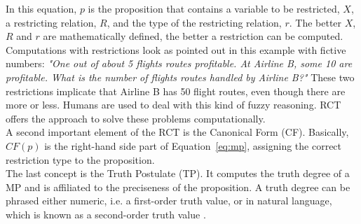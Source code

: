 \documentclass[conference]{IEEEtran}
\begin{document}
In this equation, \begin{math} p \end{math} is the proposition that contains a variable to be restricted, \begin{math} X \end{math}, a restricting relation, \begin{math} R \end{math}, and the type of the restricting relation, \begin{math} r \end{math}. The better \begin{math} X \end{math}, \begin{math} R \end{math} and \begin{math} r \end{math} are mathematically defined, the better a restriction can be computed. Computations with restrictions look as pointed out in this example with fictive numbers: \emph{"One out of about 5 flights routes profitable. At Airline B, some 10 are profitable. What is the number of flights routes handled by Airline B?"} These two restrictions implicate that Airline B has 50 flight routes, even though there are more or less. Humans are used to deal with this kind of fuzzy reasoning. RCT offers the approach to solve these problems computationally.\\
A second important element of the RCT is the Canonical Form (CF). Basically, \begin{math} CF(p) \end{math} is the right-hand side part of Equation~\ref{eq:mp}, assigning the correct restriction type to the proposition.\\
The last concept is the Truth Postulate (TP). It computes the truth degree of a MP and is affiliated to the preciseness of the proposition. A truth degree can be phrased either numeric, i.e. a first-order truth value, or in natural language, which is known as a second-order truth value \cite{zadeh2013}.
\end{document}
